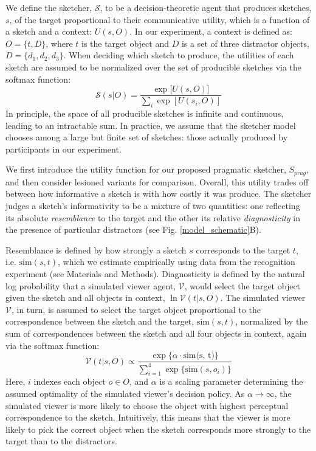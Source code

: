 \documentclass[9pt,twocolumn,twoside]{pnas-new}
\begin{document}
We define the sketcher, $\mathcal{S}$, to be a decision-theoretic agent that produces sketches, $s$, of the target proportional to their communicative utility, which is a function of a sketch and a context: $U(s,O)$.
In our experiment, a context is defined as:
$O = \{t,D\}$, where $t$ is the target object and $D$ is a set of three distractor objects, $D=\{d_1,d_2,d_3\}$.  
When deciding which sketch to produce, the utilities of each sketch are assumed to be normalized over the set of producible sketches via the softmax function: 
\begin{equation} \label{sketcher_distribution}
\mathcal{S}(s|O) = \frac {\exp [{U(s,O)]}} {\sum_{i} {\exp [U(s_i,O)]}}
\end{equation}
In principle, the space of all producible sketches is infinite and continuous, leading to an intractable sum.
In practice, we assume that the sketcher model chooses among a large but finite set of sketches: those actually produced by participants in our experiment.

We first introduce the utility function for our proposed pragmatic sketcher, $S_{prag}$, and then consider lesioned variants for comparison. 
Overall, this utility trades off between how informative a sketch is with how costly it was produce.
The sketcher judges a sketch's informativity to be a mixture of two quantities: one reflecting its absolute \textit{resemblance} to the target and the other its relative \textit{diagnosticity} in the presence of particular distractors (see Fig. \ref{model_schematic}B).  

Resemblance is defined by how strongly a sketch $s$ corresponds to the target $t$, i.e. $\textrm{sim}(s,t)$, which we estimate empirically using data from the recognition experiment (see Materials and Methods).
Diagnosticity is defined by the natural log probability that a simulated viewer agent, $\mathcal{V}$, would select the target object given the sketch and all objects in context, $\ln \mathcal{V}(t|s,O)$. 
The simulated viewer $\mathcal{V}$, in turn, is assumed to select the target object proportional to the correspondence between the sketch and the target, $\textrm{sim}(s,t)$, normalized by the sum of correspondences between the sketch and all four objects in context, again via the softmax function:
\begin{equation} \label{literal_viewer_score}
\mathcal{V}(t|s,O) \propto \frac {\exp\{\alpha \cdot \textrm{sim(s, t)}\}} {\sum_{i=1}^{4} \exp\{\textrm{sim}(s,o_i)\}}
\end{equation}
Here, $i$ indexes each object $o\in O$, and $\alpha$ is a scaling parameter determining the assumed optimality of the simulated viewer's decision policy. 
As $\alpha \rightarrow \infty$, the simulated viewer is more likely to choose the object with highest perceptual correspondence to the sketch. 
Intuitively, this means that the viewer is more likely to pick the correct object when the sketch corresponds more strongly to the target than to the distractors. 
\end{document}
